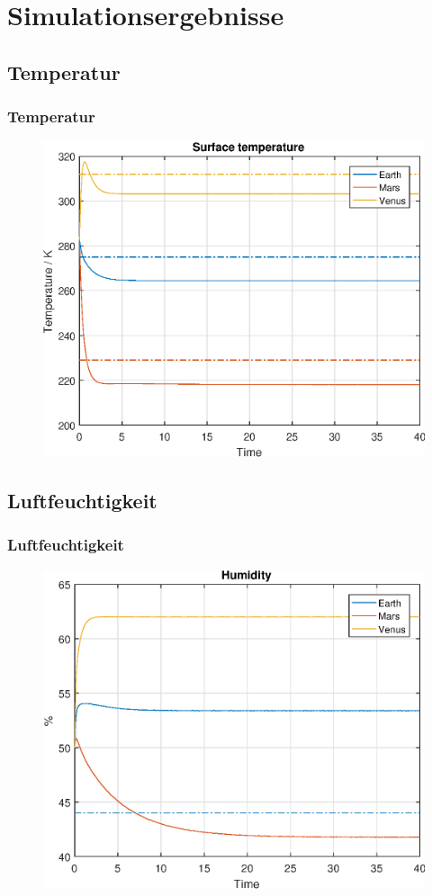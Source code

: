 \documentclass{beamer}
\begin{document}
\section{Simulationsergebnisse}

\subsection{Temperatur}
\begin{frame}
	\frametitle{Temperatur}
		\begin{figure}
			\includegraphics[width=0.9\linewidth]{Matlab/figures/surfaceTemperature.eps}
		\end{figure}
\end{frame}

\subsection{Luftfeuchtigkeit}
\begin{frame}
	\frametitle{Luftfeuchtigkeit}
		\begin{figure}
			\includegraphics[width=0.9\linewidth]{Matlab/figures/humidity.eps}
		\end{figure}
\end{frame}
\end{document}
